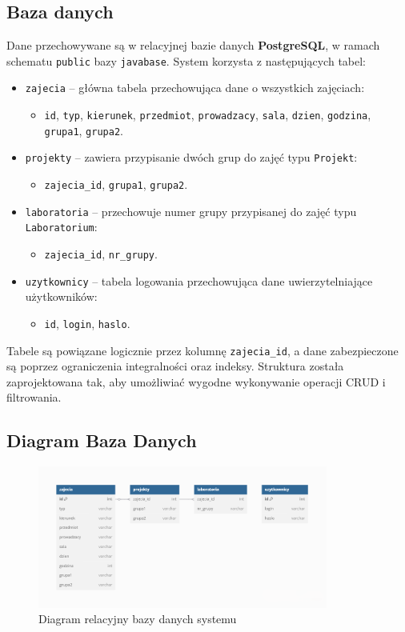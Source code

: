 \subsection{Baza danych}

Dane przechowywane są w relacyjnej bazie danych \textbf{PostgreSQL}, w ramach schematu \texttt{public} bazy \texttt{javabase}. System korzysta z następujących tabel:

\begin{itemize}
    \item \texttt{zajecia} – główna tabela przechowująca dane o wszystkich zajęciach:
    \begin{itemize}
        \item \texttt{id}, \texttt{typ}, \texttt{kierunek}, \texttt{przedmiot}, \texttt{prowadzacy}, \texttt{sala}, \texttt{dzien}, \texttt{godzina}, \texttt{grupa1}, \texttt{grupa2}.
    \end{itemize}

    \item \texttt{projekty} – zawiera przypisanie dwóch grup do zajęć typu \texttt{Projekt}:
    \begin{itemize}
        \item \texttt{zajecia\_id}, \texttt{grupa1}, \texttt{grupa2}.
    \end{itemize}

    \item \texttt{laboratoria} – przechowuje numer grupy przypisanej do zajęć typu \texttt{Laboratorium}:
    \begin{itemize}
        \item \texttt{zajecia\_id}, \texttt{nr\_grupy}.
    \end{itemize}

    \item \texttt{uzytkownicy} – tabela logowania przechowująca dane uwierzytelniające użytkowników:
    \begin{itemize}
        \item \texttt{id}, \texttt{login}, \texttt{haslo}.
    \end{itemize}
\end{itemize}

Tabele są powiązane logicznie przez kolumnę \texttt{zajecia\_id}, a dane zabezpieczone są poprzez ograniczenia integralności oraz indeksy. Struktura została zaprojektowana tak, aby umożliwiać wygodne wykonywanie operacji CRUD i filtrowania.

\subsection{Diagram Baza Danych}

\begin{figure}[H]
    \centering
    \includegraphics[width=0.85\textwidth]{figures/diagramDB.png}
    \caption{Diagram relacyjny bazy danych systemu}
    \label{fig:diagram-db}
\end{figure}